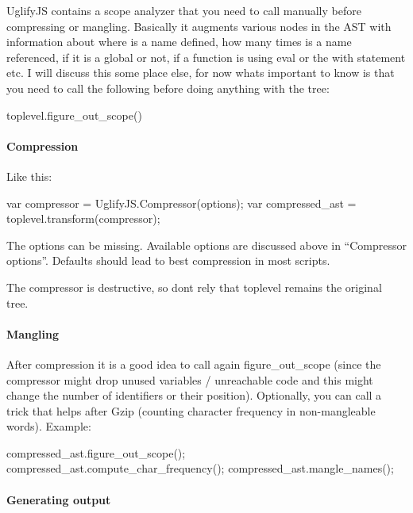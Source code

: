 Uglify\+JS contains a scope analyzer that you need to call manually before compressing or mangling. Basically it augments various nodes in the A\+ST with information about where is a name defined, how many times is a name referenced, if it is a global or not, if a function is using {\ttfamily eval} or the {\ttfamily with} statement etc. I will discuss this some place else, for now what\textquotesingle{}s important to know is that you need to call the following before doing anything with the tree\+: 
\begin{DoxyCode}
toplevel.figure\_out\_scope()
\end{DoxyCode}


\paragraph*{Compression}

Like this\+: 
\begin{DoxyCode}
var compressor = UglifyJS.Compressor(options);
var compressed\_ast = toplevel.transform(compressor);
\end{DoxyCode}


The {\ttfamily options} can be missing. Available options are discussed above in “\+Compressor options”. Defaults should lead to best compression in most scripts.

The compressor is destructive, so don\textquotesingle{}t rely that {\ttfamily toplevel} remains the original tree.

\paragraph*{Mangling}

After compression it is a good idea to call again {\ttfamily figure\+\_\+out\+\_\+scope} (since the compressor might drop unused variables / unreachable code and this might change the number of identifiers or their position). Optionally, you can call a trick that helps after Gzip (counting character frequency in non-\/mangleable words). Example\+: 
\begin{DoxyCode}
compressed\_ast.figure\_out\_scope();
compressed\_ast.compute\_char\_frequency();
compressed\_ast.mangle\_names();
\end{DoxyCode}


\paragraph*{Generating output}


